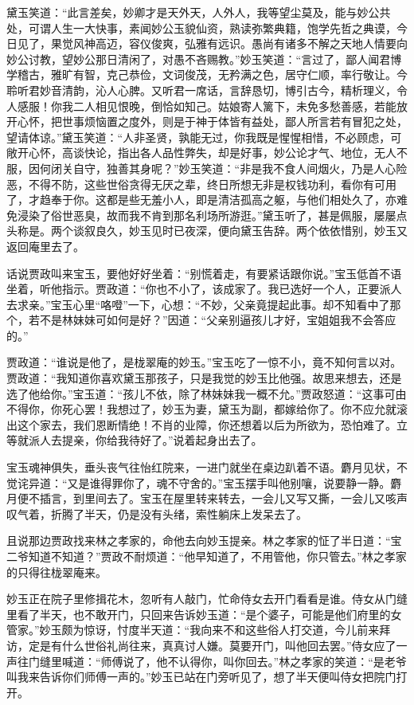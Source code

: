 \documentclass[12pt,oneside]{book}
\begin{document}
黛玉笑道：“此言差矣，妙卿才是天外天，人外人，我等望尘莫及，能与妙公共处，可谓人生一大快事，素闻妙公玉貌仙资，熟读弥繁典籍，饱学先哲之典谟，今日见了，果觉风神高迈，容仪俊爽，弘雅有远识。愚尚有诸多不解之天地人情要向妙公讨教，望妙公那日清闲了，对愚不吝赐教。”妙玉笑道：“言过了，鄙人闻君博学稽古，雅旷有智，克己恭俭，文词俊茂，无矜满之色，居守仁顺，率行敬让。今聆听君妙音清韵，沁人心脾。又听君一席话，言辞恳切，博引古今，精析理义，令人感服！你我二人相见恨晚，倒恰如知己。姑娘寄人篱下，未免多愁善感，若能放开心怀，把世事烦恼置之度外，则是于神于体皆有益处，鄙人所言若有冒犯之处，望请体谅。”黛玉笑道：“人非圣贤，孰能无过，你我既是惺惺相惜，不必顾虑，可敞开心怀，高谈快论，指出各人品性弊失，却是好事，妙公论才气、地位，无人不服，因何闭关自守，独善其身呢？”妙玉笑道：“非是我不食人间烟火，乃是人心险恶，不得不防，这些世俗贪得无厌之辈，终日所想无非是权钱功利，看你有可用了，才趋奉于你。这都是些无羞小人，即是清洁孤高之躯，与他们相处久了，亦难免浸染了俗世恶臭，故而我不肯到那名利场所游逛。”黛玉听了，甚是佩服，屡屡点头称是。两个谈叙良久，妙玉见时已夜深，便向黛玉告辞。两个依依惜别，妙玉又返回庵里去了。

话说贾政叫来宝玉，要他好好坐着：“别慌着走，有要紧话跟你说。”宝玉低首不语坐着，听他指示。贾政道：“你也不小了，该成家了。我已选好一个人，正要派人去求亲。”宝玉心里“咯噔”一下，心想：“不妙，父亲竟提起此事。却不知看中了那个，若不是林妹妹可如何是好？”因道：“父亲别逼孩儿才好，宝姐姐我不会答应的。”

贾政道：“谁说是他了，是栊翠庵的妙玉。”宝玉吃了一惊不小，竟不知何言以对。贾政道：“我知道你喜欢黛玉那孩子，只是我觉的妙玉比他强。故思来想去，还是选了他给你。”宝玉道：“孩儿不依，除了林妹妹我一概不允。”贾政怒道：“这事可由不得你，你死心罢！我想过了，妙玉为妻，黛玉为副，都嫁给你了。你不应允就滚出这个家去，我们恩断情绝！不肖的业障，你还想着以后为所欲为，恐怕难了。立等就派人去提亲，你给我待好了。”说着起身出去了。

宝玉魂神俱失，垂头丧气往怡红院来，一进门就坐在桌边趴着不语。麝月见状，不觉诧异道：“又是谁得罪你了，魂不守舍的。”宝玉摆手叫他别嚷，说要静一静。麝月便不插言，到里间去了。宝玉在屋里转来转去，一会儿又写又撕，一会儿又咳声叹气着，折腾了半天，仍是没有头绪，索性躺床上发呆去了。

且说那边贾政找来林之孝家的，命他去向妙玉提亲。林之孝家的怔了半日道：“宝二爷知道不知道？”贾政不耐烦道：“他早知道了，不用管他，你只管去。”林之孝家的只得往栊翠庵来。

妙玉正在院子里修揖花木，忽听有人敲门，忙命侍女去开门看看是谁。侍女从门缝里看了半天，也不敢开门，只回来告诉妙玉道：“是个婆子，可能是他们府里的女管家。”妙玉颇为惊讶，忖度半天道：“我向来不和这些俗人打交道，今儿前来拜访，定是有什么世俗礼尚往来，真真讨人嫌。莫要开门，叫他回去罢。”侍女应了一声往门缝里喊道：“师傅说了，他不认得你，叫你回去。”林之孝家的笑道：“是老爷叫我来告诉你们师傅一声的。”妙玉已站在门旁听见了，想了半天便叫侍女把院门打开。
\end{document}

